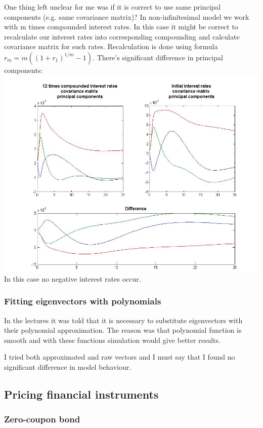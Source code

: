 \documentclass[11pt]{article} %
\begin{document}
One thing left unclear for me was if it is correct to use same principal components (e.g. same covariance matrix)? In non-infinitesimal model we work with m times compounded interest rates. In this case it might be correct to recalculate our interest rates into corresponding compounding and calculate covariance matrix for such rates. Recalculation is done using formula $r_m = m\left((1+r_1)^{1/m}-1\right)$. There's significant difference in principal components:\\
\includegraphics[scale=0.4]{compounding_PCA.jpg}\\
In this case no negative interest rates occur.

\subsubsection{Fitting eigenvectors with polynomials}
In the lectures it was told that it is necessary to substitute eigenvectors with their polynomial approximation. The reason was that polynomial function is smooth and with these functions simulation would give better results.

I tried both approximated and raw vectors and I must say that I found no significant difference in model behaviour.

\subsection{Pricing financial instruments}

\subsubsection{Zero-coupon bond}
\end{document}

